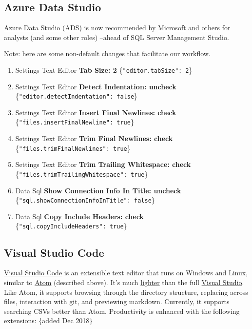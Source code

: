 \documentclass[
]{book}
\providecommand{\tightlist}{%
  \setlength{\itemsep}{0pt}\setlength{\parskip}{0pt}}
\begin{document}
\hypertarget{workstation-ads}{%
\subsection{Azure Data Studio}\label{workstation-ads}}

\href{https://docs.microsoft.com/en-us/sql/azure-data-studio/download}{Azure Data Studio (ADS)} is now recommended by \href{https://cloudblogs.microsoft.com/sqlserver/2018/09/25/azure-data-studio-for-sql-server/}{Microsoft} and \href{https://www.brentozar.com/archive/2019/04/if-you-work-with-sql-server-youre-really-lucky/}{others} for analysts (and some other roles) --ahead of SQL Server Management Studio.

Note: here are some non-default changes that facilitate our workflow.

\begin{enumerate}
\def\labelenumi{\arabic{enumi}.}
\tightlist
\item
  Settings \textbar{} Text Editor \textbar{} \textbf{Tab Size: 2} \{\texttt{"editor.tabSize":\ 2}\}
\item
  Settings \textbar{} Text Editor \textbar{} \textbf{Detect Indentation: uncheck} \{\texttt{"editor.detectIndentation":\ false}\}
\item
  Settings \textbar{} Text Editor \textbar{} \textbf{Insert Final Newlines: check} \{\texttt{"files.insertFinalNewline":\ true}\}
\item
  Settings \textbar{} Text Editor \textbar{} \textbf{Trim Final Newlines: check} \{\texttt{"files.trimFinalNewlines":\ true}\}
\item
  Settings \textbar{} Text Editor \textbar{} \textbf{Trim Trailing Whitespace: check} \{\texttt{"files.trimTrailingWhitespace":\ true}\}
\item
  Data \textbar{} Sql \textbar{} \textbf{Show Connection Info In Title: uncheck} \{\texttt{"sql.showConnectionInfoInTitle":\ false}\}
\item
  Data \textbar{} Sql \textbar{} \textbf{Copy Include Headers: check} \{\texttt{"sql.copyIncludeHeaders":\ true}\}
\end{enumerate}

\hypertarget{workstation-vscode}{%
\subsection{Visual Studio Code}\label{workstation-vscode}}

\href{https://code.visualstudio.com/}{Visual Studio Code} is an extensible text editor that runs on Windows and Linux, similar to \href{https://atom.io/}{Atom} (described above). It's much \href{https://stackoverflow.com/questions/30527522/what-are-the-differences-between-visual-studio-code-and-visual-studio}{lighter} than the full \href{https://visualstudio.microsoft.com/}{Visual Studio}. Like Atom, it supports browsing through the directory structure, replacing across files, interaction with git, and previewing markdown. Currently, it supports searching CSVs better than Atom. Productivity is enhanced with the following extensions: \{added Dec 2018\}
\end{document}
